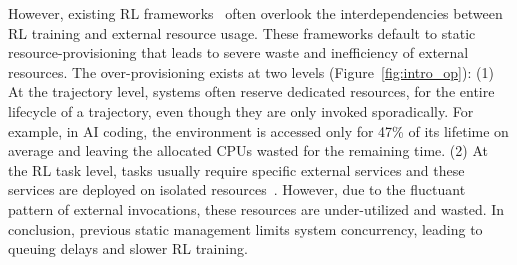 
However, existing RL frameworks~\citep{sheng2025hybridflow,fu2025areal} often overlook the interdependencies between RL training and external resource usage.
These frameworks default to static resource-provisioning that leads to severe waste and inefficiency of external resources.
The over-provisioning exists at two levels (Figure~\ref{fig:intro_op}):
(1) At the trajectory level, systems often reserve dedicated resources, for the entire lifecycle of a trajectory, even though they are only invoked sporadically.
For example, in AI coding, the environment is accessed only for 47\% of its lifetime on average and leaving the allocated CPUs wasted for the remaining time.
(2) At the RL task level, tasks usually require specific external services and these services are deployed on isolated resources~\citep{jiang2025verltool,micromulti}.
However, due to the fluctuant pattern of external invocations, these resources are under-utilized and wasted.
In conclusion, previous static management limits system concurrency, leading to queuing delays and slower RL training.



